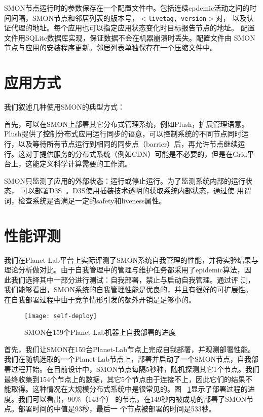 SMON节点运行时的参数保存在一个配置文件中。包括连续epdemic活动之间的时
间间隔，SMON节点和邻居列表的版本号，$<$\texttt{livetag, version}$>$对，
以及认证代理的地址。每个应用也可以指定应用状态变化时目标报告节点的地址。
配置文件用SQLite数据库实现，保证数据不会在机器崩溃时丢失。配置文件由
SMON节点与应用的安装程序更新。邻居列表单独保存在一个压缩文件中。


\section{应用方式}
\label{sec:smon_app}

我们叙述几种使用SMON的典型方式：

首先，可以在SMON上部署其它分布式管理系统，例如Plush，扩展管理语意。
Plush提供了控制分布式应用运行同步的语意，可以控制系统的不同节点同时运
行，以及等待所有节点运行到相同的同步点（barrier）后，再允许节点继续运
行。这对于提供服务的分布式系统（例如CDN）可能是不必要的，但是在Grid平
台上，这能定义科学计算需要的工作流。

SMON只监测了应用的外部状态：运行或停止运行。为了监测系统内部的运行状态，
可以部署D3S~\cite{d3s}。D3S使用插装技术透明的获取系统内部状态，通过使
用谓词，检查系统是否满足一定的safety和liveness属性。

\section{性能评测}
\label{sec:smon_eval}

我们在Planet-Lab平台上实际评测了SMON系统自我管理的性能，并将实验结果与
理论分析做对比。由于自我管理中的管理与维护任务都采用了epidemic算法，因
此我们选择其中一部分进行测试：自我部署，禁止与启动自我管理。通过评
测，我们能够看出，SMON系统的自我管理性能是优良的，并且有很好的可扩展性。
在自我部署过程中由于竞争情形引发的额外开销是足够小的。

\begin{figure}
\centering
  \begin{minipage}{0.8\linewidth}
    \centering
    \texttt{[image: self-deploy]}
    \caption{SMON在159个Planet-Lab机器上自我部署的进度}
    \label{fig:self-deploy}
  \end{minipage}
\end{figure}

首先，我们让SMON在159台Planet-Lab节点上完成自我部署，并观测部署性能。
我们在随机选取的一个Planet-Lab节点上，部署并启动了一个SMON节点，自我部
署过程开始。在目前设计中，SMON节点每隔5秒种，随机探测其它1个节点。我们
最终收集到154个节点上的数据，其它5个节点由于连接不上，因此它们的结果不
能取得。这种情况在大规模分布式系统中是很常见的。图~
\ref{fig:self-deploy}显示了部署过程的进度。我们可以看出，90\%（143个）
的节点，在149秒内被成功的部署了SMON节点。部署时间的中值是93秒，最后一
个节点被部署的时间是533秒。


